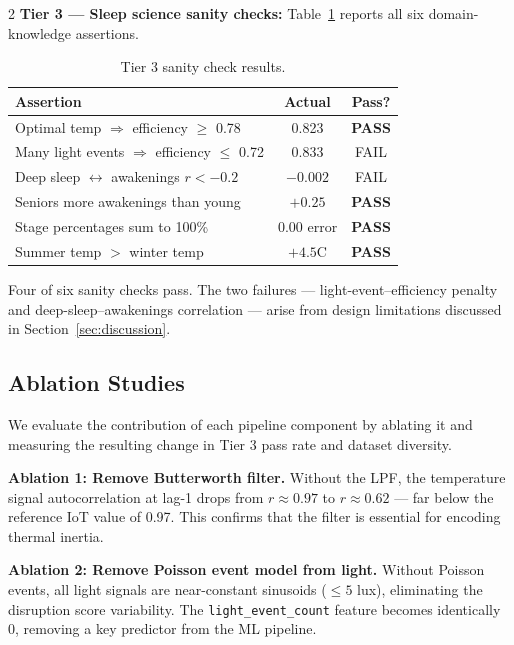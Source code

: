 \documentclass[11pt,a4paper]{article}
\begin{document}
\begin{multicols}{2}
\textbf{Tier 3 — Sleep science sanity checks:}
Table~\ref{tab:sanity} reports all six domain-knowledge assertions.

\begin{table}[t]
  \centering
  \small
  \caption{Tier 3 sanity check results.}
  \label{tab:sanity}
  \begin{tabular}{@{}p{4.8cm}cc@{}}
    \toprule
    \textbf{Assertion} & \textbf{Actual} & \textbf{Pass?} \\
    \midrule
    Optimal temp $\Rightarrow$ efficiency $\geq$ 0.78 & 0.823 & \textbf{PASS} \\
    Many light events $\Rightarrow$ efficiency $\leq$ 0.72 & 0.833 & FAIL \\
    Deep sleep $\leftrightarrow$ awakenings $r < -0.2$ & $-0.002$ & FAIL \\
    Seniors more awakenings than young & $+0.25$ & \textbf{PASS} \\
    Stage percentages sum to 100\% & 0.00 error & \textbf{PASS} \\
    Summer temp $>$ winter temp & $+4.5$\textdegree{}C & \textbf{PASS} \\
    \bottomrule
  \end{tabular}
\end{table}

Four of six sanity checks pass.  The two failures — light-event–efficiency
penalty and deep-sleep–awakenings correlation — arise from design limitations
discussed in Section~\ref{sec:discussion}.

\subsection{Ablation Studies}
\label{sec:ablation}

We evaluate the contribution of each pipeline component by ablating it and
measuring the resulting change in Tier 3 pass rate and dataset diversity.

\textbf{Ablation 1: Remove Butterworth filter.}
Without the LPF, the temperature signal autocorrelation at lag-1 drops from
$r \approx 0.97$ to $r \approx 0.62$ — far below the reference IoT value of
0.97.  This confirms that the filter is essential for encoding thermal inertia.

\textbf{Ablation 2: Remove Poisson event model from light.}
Without Poisson events, all light signals are near-constant sinusoids ($\leq 5$ lux),
eliminating the disruption score variability.  The \texttt{light\_event\_count}
feature becomes identically 0, removing a key predictor from the ML pipeline.


\end{multicols}
\end{document}

